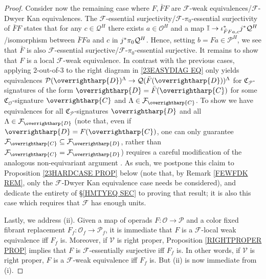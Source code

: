 \documentclass[a4paper,10pt
,draft
]{article}%
\numberwithin{equation}{section}
\numberwithin{figure}{section}
\newtheorem{lemma}[equation]{Lemma}%
\theoremstyle{definition} %
\newcommand{\vect}[1]{\text{\overrightharp{\ensuremath{#1}}}}
\newcommand{\F}{\ensuremath{\mathcal F}}
\newcommand{\V}{\ensuremath{\mathcal V}}
\renewcommand{\O}{\ensuremath{\mathcal O}}
\renewcommand{\P}{\ensuremath{\mathcal P}}
\newcommand{\C}{\ensuremath{\mathcal C}}
\newcommand{\1}{\ensuremath{\mathbbm 1}}%
\begin{document}
\begin{proof}
Consider now the remaining case where
$F,\bar{F}F$ are
$\F$-weak equivalences/$\F$-Dwyer Kan equivalences.
The $\F$-essential surjectivity/$\F$-$\pi_0$-essential surjectivity
of $\bar{F}F$
states that for any $c \in \mathcal{Q}^H$
there exists $a \in \mathcal{O}^H$ and a map
$\mathbb{I} \to \iota^{\**}_{\bar{F}Fa,c} j^{\**}\mathcal{Q}^H$
/isomorphism between $\bar{F}Fa$ and 
$c$ in $j^{\**}\pi_0\mathcal{Q}^H$.
Hence, setting $b = Fa \in \mathcal{P}^H$,
we see that $\bar{F}$ is also
$\F$-essential surjective/$\F$-$\pi_0$-essential surjective.
It remains to show that
$F$ is a local $\F$-weak equivalence.
In contrast with the previous cases,
applying $2$-out-of-$3$ to the right diagram in \eqref{23EASYDIAG EQ}
only yields equivalences 
$\P(\vect{D})^{\Lambda} \to \mathcal{Q}(\bar{F}(\vect{D}))^{\Lambda}$
for $\mathfrak{C}_{\P}$-signatures of the form
$\vect{D} = \bar{F} (\vect{C})$ for some $\mathfrak{C}_{\O}$-signature $\vect{C}$ 
and $\Lambda \in \F_{\vect{C}}$.
To show we have equivalences for all
$\mathfrak{C}_{\P}$-signatures $\vect{D}$
and all $\Lambda \in \F_{\vect{D}}$
(note that, even if $\vect{D} = F(\vect{C})$,
one can only guarantee $\F_{\vect{C}} \subseteq \F_{\vect{D}}$,
rather than $\F_{\vect{C}} = \F_{\vect{D}}$)
requires a careful modification of the analogous non-equivariant argument \cite[Lemma 4.14]{Cav}.
As such, we postpone this claim to 
Proposition \ref{23HARDCASE PROP} below
(note that, by Remark \ref{FEWFDK REM}, 
only the $\F$-Dwyer Kan equivalence case needs be considered),
and dedicate the entirety of \S \ref{HMTYEQ SEC}
to proving that result;
it is also this case which requires that $\F$ has enough units.


Lastly, we address (ii).
Given a map of operads $F\colon \O \to \P$ and a color fixed fibrant replacement
$F_f \colon \O_f \to \P_f$,
it is immediate that 
$F$ is a $\F$-local weak equivalence iff $F_f$ is.
Moreover, if $\V$ is right proper, Proposition \ref{RIGHTPROPER PROP}
implies that $F$ is $\F$-essentially surjective iff $F_f$ is.
In other words, if $\V$ is right proper,
$F$ is a $\F$-weak equivalence iff $F_f$ is.
But (ii) is now immediate from (i).
\end{proof}



\end{document}
